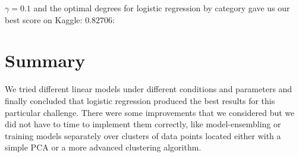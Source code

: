 \documentclass[10pt,conference,compsocconf]{IEEEtran}
\begin{document}
$\gamma = 0.1$ and the optimal degrees for logistic regression by category gave us our best score on Kaggle: $0.82706$:

\section{Summary}

We tried different linear models under different conditions and parameters and finally concluded that logistic regression produced the best results for this particular challenge. There were some improvements that we considered but we did not have to time to implement them correctly, like model-ensembling or training models separately over clusters of data points located either with a simple PCA or a more  advanced clustering algorithm.

\newpage


\end{document}
